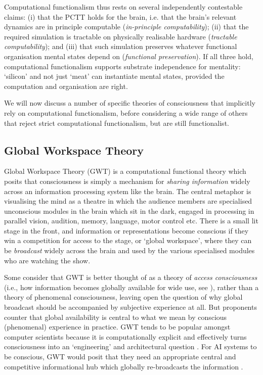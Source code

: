 \documentclass[11pt, a4paper, onecolumn, gdm]{google}
\begin{document}
Computational functionalism thus rests on several independently contestable claims: (i) that the PCTT holds for the brain, i.e. that the brain's relevant dynamics are in principle computable (\emph{in-principle computability}); (ii) that the required simulation is tractable on physically realisable hardware (\emph{tractable computability}); and (iii) that such simulation preserves whatever functional organisation mental states depend on (\emph{functional preservation}).
If all three hold, computational functionalism supports substrate independence for mentality: `silicon' and not just `meat' can instantiate mental states, provided the computation and organisation are right.

We will now discuss a number of specific theories of consciousness that implicitly rely on computational functionalism, before considering a wide range of others that reject strict computational functionalism, but are still functionalist.

\subsection{Global Workspace Theory}\label{global-workspace-theory}

Global Workspace Theory (GWT) is a computational functional theory which posits that consciousness is simply a mechanism for \emph{sharing information} widely across an information processing system like the brain.
The central metaphor is visualising the mind as a theatre in which the audience members are specialised unconscious modules in the brain \citep{baars1997} which sit in the dark, engaged in processing in parallel vision, audition, memory, language, motor control etc. There is a small lit stage in the front, and information or representations become conscious if they win a competition for access to the stage, or `global workspace', where they can be \emph{broadcast} widely across the brain and used by the various specialised modules who are watching the show.

Some consider that GWT is better thought of as a theory of \emph{access consciousness} (i.e., how information becomes globally available for wide use, see ), rather than a theory of phenomenal consciousness, leaving open the question of why global broadcast should be accompanied by subjective experience at all.
But proponents counter that global availability is central to what we mean by conscious (phenomenal) experience in practice.
GWT tends to be popular amongst computer scientists because it is computationally explicit and effectively turns consciousness into an `engineering' and architectural question \citetext{; \citealp{dossa2024}; \citealp{goyal2022}; \citealp{juliani2022}}.
For AI systems to be conscious, GWT would posit that they need an appropriate central and competitive informational hub which globally re-broadcasts the information \citep{vanrullen2021,goldstein2024}.
\end{document}
